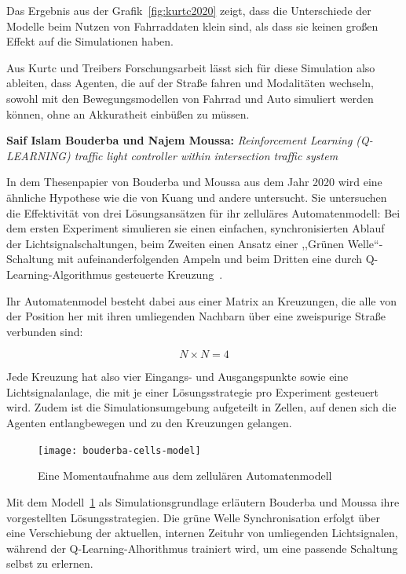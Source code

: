 Das Ergebnis aus der Grafik~\ref{fig:kurtc2020} zeigt, dass die Unterschiede der Modelle beim Nutzen von Fahrraddaten klein sind, als dass sie keinen großen Effekt auf die Simulationen haben.

Aus Kurtc und Treibers Forschungsarbeit lässt sich für diese Simulation also ableiten, dass Agenten, die auf der Straße fahren und Modalitäten wechseln, sowohl mit den Bewegungsmodellen von Fahrrad und Auto simuliert werden können, ohne an Akkuratheit einbüßen zu müssen.


\textbf{Saif Islam Bouderba und Najem Moussa:}
\textit{Reinforcement Learning (Q-LEARNING) traffic light controller within intersection traffic system}

In dem Thesenpapier von Bouderba und Moussa aus dem Jahr 2020 wird eine ähnliche Hypothese wie die von Kuang und andere untersucht.
Sie untersuchen die Effektivität von drei Lösungsansätzen für ihr zelluläres Automatenmodell:
Bei dem ersten Experiment simulieren sie einen einfachen, synchronisierten Ablauf der Lichtsignalschaltungen, beim Zweiten einen Ansatz einer ,,Grünen Welle``-Schaltung mit aufeinanderfolgenden Ampeln und beim Dritten eine durch Q-Learning-Algorithmus gesteuerte Kreuzung~\cite{Bouderba2019}.

Ihr Automatenmodel besteht dabei aus einer Matrix an Kreuzungen, die alle von der Position her mit ihren umliegenden Nachbarn über eine zweispurige Straße verbunden sind:

\[N \times N = 4\]

Jede Kreuzung hat also vier Eingangs- und Ausgangspunkte sowie eine Lichtsignalanlage, die mit je einer Lösungsstrategie pro Experiment gesteuert wird.
Zudem ist die Simulationsumgebung aufgeteilt in Zellen, auf denen sich die Agenten entlangbewegen und zu den Kreuzungen gelangen\cite{Bouderba2019}.

\begin{figure}[h]
    \centering
    \texttt{[image: bouderba-cells-model]}~\caption{Eine Momentaufnahme aus dem zellulären Automatenmodell~\cite{Bouderba2019}}
    \label{fig:bouderba-cells-model}
\end{figure}

Mit dem Modell~\ref{fig:bouderba-cells-model} als Simulationsgrundlage erläutern Bouderba und Moussa ihre vorgestellten Lösungsstrategien.
Die grüne Welle Synchronisation erfolgt über eine Verschiebung der aktuellen, internen Zeituhr von umliegenden Lichtsignalen, während der Q-Learning-Alhorithmus trainiert wird, um eine passende Schaltung selbst zu erlernen.

